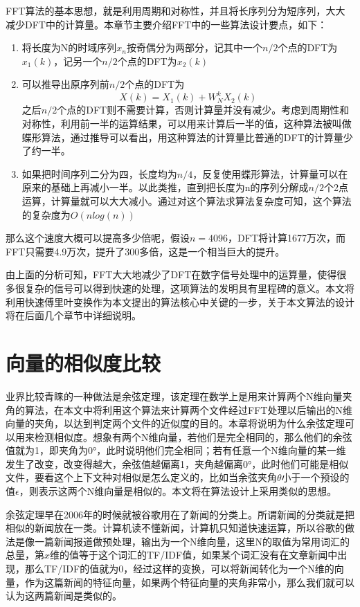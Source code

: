 FFT算法的基本思想，就是利用周期和对称性，并且将长序列分为短序列，大大减少DFT中的计算量。本章节主要介绍FFT中的一些算法设计要点，如下：

\begin{enumerate}
\item 将长度为N的时域序列$x_n$按奇偶分为两部分，记其中一个$n/2$个点的DFT为$x_1(k)$，记另一个$n/2$个点的DFT为$x_2(k)$
\item 可以推导出原序列前$n/2$个点的DFT为$$X(k)=X_1(k)+W^k_NX_2(k)$$之后$n/2$个点的DFT则不需要计算，否则计算量并没有减少。考虑到周期性和对称性，利用前一半的运算结果，可以用来计算后一半的值，这种算法被叫做蝶形算法，通过推导可以看出，用这种算法的计算量比普通的DFT的计算量少了约一半。
\item 如果把时间序列二分为四，长度均为$n/4$，反复使用蝶形算法，计算量可以在原来的基础上再减小一半。以此类推，直到把长度为n的序列分解成$n/2$个2点运算，计算量就可以大大减小。通过对这个算法求算法复杂度可知，这个算法的复杂度为$O(nlog(n))$
\end{enumerate}

那么这个速度大概可以提高多少倍呢，假设$n=4096$，DFT将计算1677万次，而FFT只需要4.9万次，提升了300多倍，这是一个相当巨大的提升。

由上面的分析可知，FFT大大地减少了DFT在数字信号处理中的运算量，使得很多很复杂的信号可以得到快速的处理，这项算法的发明具有里程碑的意义。本文将利用快速傅里叶变换作为本文提出的算法核心中关键的一步，关于本文算法的设计将在后面几个章节中详细说明。

\section{向量的相似度比较}
\label{sec:cosin}

业界比较青睐的一种做法是余弦定理，该定理在数学上是用来计算两个N维向量夹角的算法，在本文中将利用这个算法来计算两个文件经过FFT处理以后输出的N维向量的夹角，以达到判定两个文件的近似度的目的。本章将说明为什么余弦定理可以用来检测相似度。想象有两个N维向量，若他们是完全相同的，那么他们的余弦值就为1，即夹角为0°，此时说明他们完全相同；若有任意一个N维向量的某一维发生了改变，改变得越大，余弦值越偏离1，夹角越偏离0°，此时他们可能是相似文件，要看这个上下文种对相似是怎么定义的，比如当余弦夹角$\theta$小于一个预设的值$\epsilon$，则表示这两个N维向量是相似的。本文将在算法设计上采用类似的思想。

余弦定理早在2006年的时候就被谷歌用在了新闻的分类上。所谓新闻的分类就是把相似的新闻放在一类。计算机读不懂新闻，计算机只知道快速运算，所以谷歌的做法是像一篇新闻报道做预处理，输出为一个N维向量，这里N的取值为常用词汇的总量，第$x$维的值等于这个词汇的TF/IDF值，如果某个词汇没有在文章新闻中出现，那么TF/IDF的值就为0，经过这样的变换，可以将新闻转化为一个N维的向量，作为这篇新闻的特征向量，如果两个特征向量的夹角非常小，那么我们就可以认为这两篇新闻是类似的。

